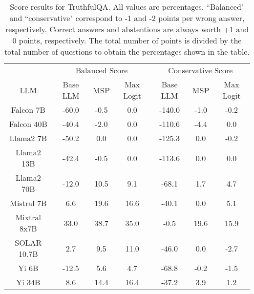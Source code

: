 \begin{table*}
\centering
\begin{tabular}{c|c|c|c|c|c|c}
& \multicolumn{3}{c|}{Balanced Score} & \multicolumn{3}{c}{Conservative Score} \\ 
LLM & Base LLM & MSP & Max Logit & Base LLM & MSP & Max Logit\\ \hline
Falcon 7B & -60.0 & -0.5 & 0.0 & -140.0 & -1.0 & -0.2\\
Falcon 40B & -40.4 & -2.0 & 0.0 & -110.6 & -4.4 & 0.0\\
Llama2 7B & -50.2 & 0.0 & 0.0 & -125.3 & 0.0 & -0.2\\
Llama2 13B & -42.4 & -0.5 & 0.0 & -113.6 & 0.0 & 0.0\\
Llama2 70B & -12.0 & 10.5 & 9.1 & -68.1 & 1.7 & 4.7\\
Mistral 7B & 6.6 & 19.6 & 16.6 & -40.1 & 0.0 & 5.1\\
Mixtral 8x7B & 33.0 & 38.7 & 35.0 & -0.5 & 19.6 & 15.9\\
SOLAR 10.7B & 2.7 & 9.5 & 11.0 & -46.0 & 0.0 & -2.7\\
Yi 6B & -12.5 & 5.6 & 4.7 & -68.8 & -0.2 & -1.5\\
Yi 34B & 8.6 & 14.4 & 16.4 & -37.2 & 3.9 & 1.2\\
\hline
\end{tabular}
\caption{Score results for TruthfulQA. All values are percentages. ``Balanced" and ``conservative" correspond to -1 and -2 points per wrong answer, respectively. Correct answers and abstentions are always worth +1 and 0 points, respectively. The total number of points is divided by the total number of questions to obtain the percentages shown in the table.}
\label{tab:truthfulqa_score}
\end{table*}
